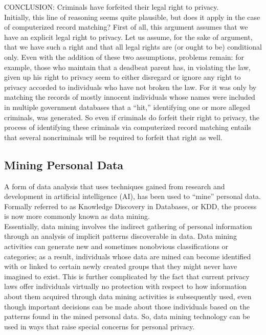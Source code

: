 \documentclass[12pt]{article}
\theoremstyle{definition}
\begin{document}
CONCLUSION: Criminals have forfeited their legal right to privacy.\\
Initially, this line of reasoning seems quite plausible, but does it apply in the case of
computerized record matching? First of all, this argument assumes that we have an
explicit legal right to privacy. Let us assume, for the sake of argument, that we have such a
right and that all legal rights are (or ought to be) conditional only. Even with the addition
of these two assumptions, problems remain: for example, those who maintain that a
deadbeat parent has, in violating the law, given up his right to privacy seem to either
disregard or ignore any right to privacy accorded to individuals who have not broken the
law. For it was only by matching the records of mostly innocent individuals whose names
were included in multiple government databases that a “hit,” identifying one or more
alleged criminals, was generated. So even if criminals do forfeit their right to privacy, the
process of identifying these criminals via computerized record matching entails that
several noncriminals will be required to forfeit that right as well.
\subsection{Mining Personal Data}
A form of data analysis that uses techniques gained from research and development in
artificial intelligence (AI), has been used to “mine” personal
data. Formally referred to as Knowledge Discovery in Databases, or KDD, the process
is now more commonly known as data mining.\\
Essentially, data mining involves the
indirect gathering of personal information through an analysis of implicit patterns
discoverable in data. Data mining activities can generate new and sometimes nonobvious
classifications or categories; as a result, individuals whose data are mined can
become identified with or linked to certain newly created groups that they might never
have imagined to exist. This is further complicated by the fact that current privacy laws
offer individuals virtually no protection with respect to how information about them
acquired through data mining activities is subsequently used, even though important
decisions can be made about those individuals based on the patterns found in the mined
personal data. So, data mining technology can be used in ways that raise special
concerns for personal privacy.
\end{document}

